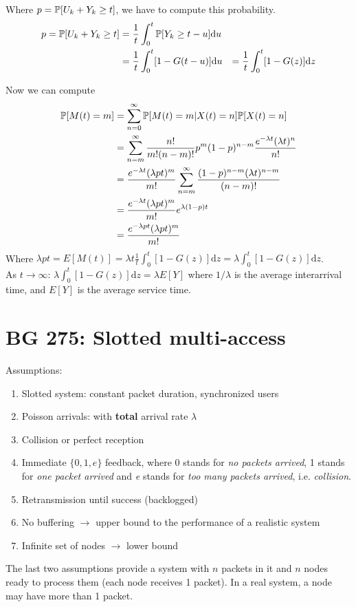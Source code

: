 Where $p = \mathbb{P}[U_k + Y_k \geq t]$, we have to compute this probability.
\begin{equation}
	\begin{split}
	 p = \mathbb{P}[U_k + Y_k \geq t] &= \frac{1}{t}\int_0^t \mathbb{P}[Y_k \geq t -u] \mathrm{d}u \\
	 &= \frac{1}{t}\int_0^t [1 - G(t-u)] \mathrm{d}u
	 &= \frac{1}{t}\int_0^t [1 - G(z)] \mathrm{d}z
	\end{split}
\end{equation}

Now we can compute
\begin{equation}
	\begin{split}
		\mathbb{P}[M(t)=m] &= \sum\limits_{n=0}^{\infty} \mathbb{P}[M(t)=m|X(t)=n]\mathbb{P}[X(t)=n] \\
		&= \sum\limits_{n=m}^{\infty} \frac{n!}{m!(n-m)!}p^m(1-p)^{n-m}\frac{e^{-\lambda t} (\lambda t)^n}{n!} \\
		&= \frac{e^{-\lambda t} (\lambda p t)^m}{m!}\sum\limits_{n=m}^{\infty} \frac{(1-p)^{n-m}(\lambda t)^{n-m}}{(n-m)!}\\
		&= \frac{e^{-\lambda t} (\lambda p t)^m}{m!} e^{\lambda(1-p)t}\\
		&= \frac{e^{-\lambda p t}(\lambda p t)^m}{m!}
	\end{split}
\end{equation}
Where $\lambda p t = E[M(t)] = \lambda t \frac{1}{t} \int_0^t [1 - G(z)] \mathrm{d}z = \lambda \int_0^t [1 - G(z)] \mathrm{d}z$. \\
As $t \rightarrow \infty$: $\lambda \int_0^t [1 - G(z)] \mathrm{d}z = \lambda E[Y]$ where $1/\lambda$ is the average interarrival time, and $E[Y]$ is the average service time.


\section{BG 275: Slotted multi-access}
Assumptions:
\begin{enumerate}
	\item Slotted system: constant packet duration, synchronized users
	\item Poisson arrivals: with \textbf{total} arrival rate $\lambda$
	\item Collision or perfect reception
	\item Immediate $ \{ 0,1, e\}$ feedback, where 0 stands for \textit{no packets arrived}, 1 stands for \textit{one packet arrived} and \textit{e} stands for \textit{too many packets arrived}, i.e. \textit{collision}.
	\item Retransmission until success (backlogged)
	\item No buffering $\rightarrow$ upper bound to the performance of a realistic system
	\item Infinite set of nodes $\rightarrow$ lower bound
\end{enumerate}
The last two assumptions provide a system with $n$ packets in it and $n$ nodes ready to process them (each node receives 1 packet).
In a real system, a node may have more than 1 packet.


